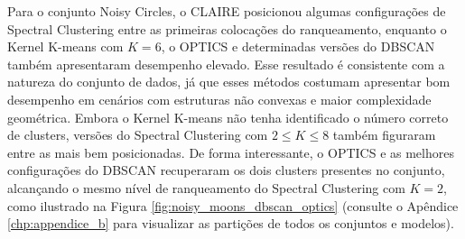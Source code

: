 Para o conjunto Noisy Circles, o \gls{CLAIRE} posicionou algumas configurações de Spectral Clustering entre as primeiras colocações do ranqueamento, enquanto o Kernel K-means com $K=6$, o OPTICS e determinadas versões do DBSCAN também apresentaram desempenho elevado. Esse resultado é consistente com a natureza do conjunto de dados, já que esses métodos costumam apresentar bom desempenho em cenários com estruturas não convexas e maior complexidade geométrica. Embora o Kernel K-means não tenha identificado o número correto de clusters, versões do Spectral Clustering com $2 \leq K \leq 8$ também figuraram entre as mais bem posicionadas. De forma interessante, o OPTICS e as melhores configurações do DBSCAN recuperaram os dois clusters presentes no conjunto, alcançando o mesmo nível de ranqueamento do Spectral Clustering com $K=2$, como ilustrado na Figura \ref{fig:noisy_moons_dbscan_optics} (consulte o Apêndice \ref{chp:appendice_b} para visualizar as partições de todos os conjuntos e modelos).

